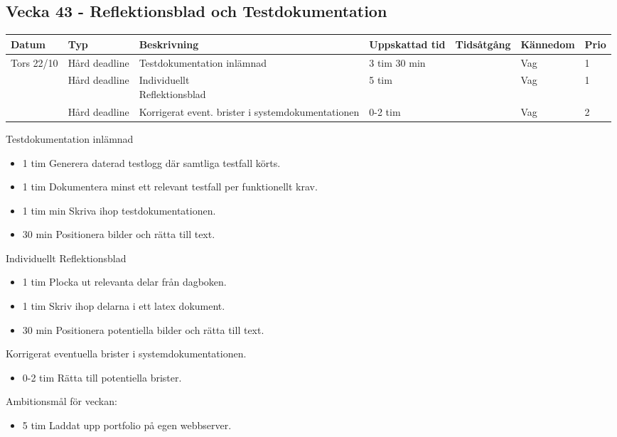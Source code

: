 \documentclass{TDP003mall}
\begin{document}
\newpage

\subsection*{Vecka 43 - Reflektionsblad och Testdokumentation}
\begin{tabularx}{\linewidth}{|l|l|X|l|l|l|l|}
	\hline
	Datum & Typ & Beskrivning  & Uppskattad tid & Tidsåtgång & Kännedom & Prio \\ [0.5ex]
	\hline                                                                             
	Tors 22/10 & Hård deadline & Testdokumentation inlämnad & 3 tim 30 min &  & Vag & 1\\
	\hline                                                                             
               & Hård deadline & \makecell[tl]{Individuellt \\ Reflektionsblad} & 5 tim &  & Vag   & 1\\
	\hline                                                                             
               & Hård deadline & Korrigerat event. brister i systemdokumentationen & 0-2 tim          &  & Vag & 2 \\
	\hline
\end{tabularx}

Testdokumentation inlämnad
\begin{itemize}
  \item 1 tim Generera daterad testlogg där samtliga testfall körts.
  \item 1 tim Dokumentera minst ett relevant testfall per funktionellt krav.
    \item 1 tim min Skriva ihop testdokumentationen.
  \item 30 min Positionera bilder och rätta till text.
\end{itemize}

Individuellt Reflektionsblad
\begin{itemize}
\item 1 tim Plocka ut relevanta delar från dagboken.
  \item 1 tim Skriv ihop delarna i ett latex dokument.
  \item 30 min Positionera potentiella bilder och rätta till text.
  \end{itemize}
  
  Korrigerat eventuella brister i systemdokumentationen.
  \begin{itemize}
  \item 0-2 tim Rätta till potentiella brister.
  \end{itemize}

Ambitionsmål för veckan:
\begin{itemize}
  \item 5 tim Laddat upp portfolio på egen webbserver.
  \end{itemize}
\end{document}
